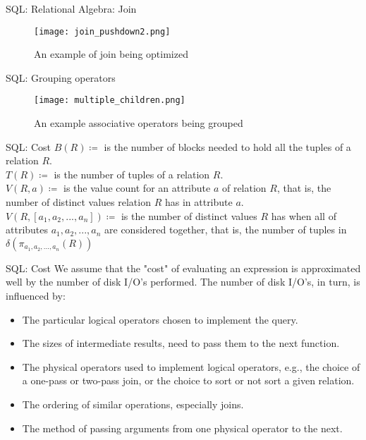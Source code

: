 \begin{frame}{SQL: Relational Algebra: Join}
    \begin{figure}
        \centering
        \texttt{[image: join\_pushdown2.png]}\\
        \caption{An example of join being optimized}
        \label{fig:j_2}
    \end{figure}
\end{frame}

\begin{frame}{SQL: Grouping operators}
    \begin{figure}
        \centering
        \texttt{[image: multiple\_children.png]}\\
        \caption{An example associative operators being grouped}
        \label{fig:j_2}
    \end{figure}
\end{frame}

\begin{frame}{SQL: Cost}
$B(R) \coloneqq$ is the number of blocks needed to hold all the tuples of a relation $R$.\\
$T(R) \coloneqq$ is the number of tuples of a relation $R$.\\
$V(R,a) \coloneqq$ is the value count for an attribute $a$ of relation $R$, that is, the number of distinct values relation $R$ has in attribute $a$.\\
$V(R, [ a_1 , a_2,..., a_n]) \coloneqq$ is the number of distinct values $R$ has when all of attributes $a_1, a_2,..., a_n$ are considered together, that is, the number of tuples in $\delta(\pi_{a_1,a_2,...,a_n}(R))$
\end{frame}

\begin{frame}{SQL: Cost}
We assume that the "cost" of evaluating an expression is approximated well by the number of disk I/O's performed. The number of disk I/O's, in turn, is influenced by:
\begin{itemize}[<+->]
    \item The particular logical operators chosen to implement the query.
    \item The sizes of intermediate results, need to pass them to the next function.
    \item The physical operators used to implement logical operators, e.g., the choice of a one-pass or two-pass join, or the choice to sort or not sort a given relation.
    \item The ordering of similar operations, especially joins.
    \item The method of passing arguments from one physical operator to the next.
\end{itemize}
\end{frame}


